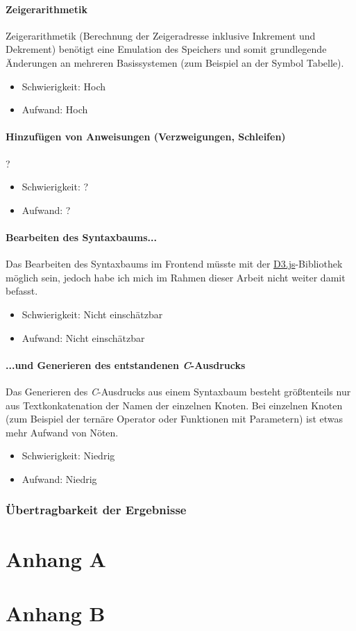 \documentclass[oneside]{ausarbeitung}
\begin{document}
\subsubsection{Zeigerarithmetik}
Zeigerarithmetik (Berechnung der Zeigeradresse inklusive Inkrement und Dekrement) benötigt eine Emulation des Speichers und somit grundlegende Änderungen an mehreren Basissystemen (zum Beispiel an der Symbol Tabelle).
\begin{itemize}
\item{Schwierigkeit: Hoch}
\item{Aufwand: Hoch}
\end{itemize}
\subsubsection{Hinzufügen von Anweisungen (Verzweigungen, Schleifen)}
?
\begin{itemize}
\item{Schwierigkeit: ?}
\item{Aufwand: ?}
\end{itemize}
\subsubsection{Bearbeiten des Syntaxbaums...}
Das Bearbeiten des Syntaxbaums im Frontend müsste mit der \href{https://d3js.org}{D3.js}-Bibliothek möglich sein, jedoch habe ich mich im Rahmen dieser Arbeit nicht weiter damit befasst.
\begin{itemize}
\item{Schwierigkeit: Nicht einschätzbar}
\item{Aufwand: Nicht einschätzbar}
\end{itemize}
\subsubsection{...und Generieren des entstandenen \textit{C}-Ausdrucks}
Das Generieren des \textit{C}-Ausdrucks aus einem Syntaxbaum besteht größtenteils nur aus Textkonkatenation der Namen der einzelnen Knoten. Bei einzelnen Knoten (zum Beispiel der ternäre Operator oder Funktionen mit Parametern) ist etwas mehr Aufwand von Nöten.
\begin{itemize}
\item{Schwierigkeit: Niedrig}
\item{Aufwand: Niedrig}
\end{itemize}

\subsection{Übertragbarkeit der Ergebnisse}
\label{sub:uebertragbarkeit}

\appendix

\printbibliography

\chapter{Anhang A}

\chapter{Anhang B}
\end{document}
